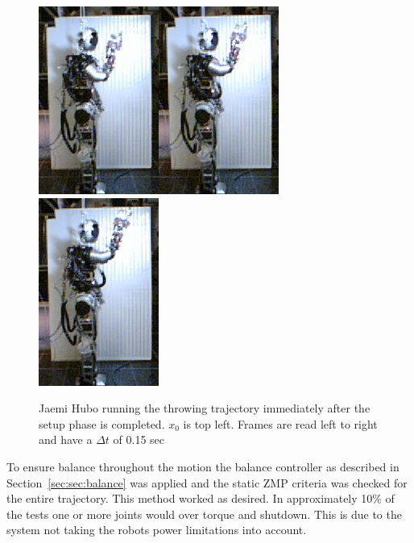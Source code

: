 \begin{figure}[ht]
\includegraphics[width=0.25\columnwidth]{./pix/slowMotion/5.png}\includegraphics[width=0.25\columnwidth]{./pix/slowMotion/6.png}\includegraphics[width=0.25\columnwidth]{./pix/slowMotion/7.png}
  \caption{Jaemi Hubo running the throwing trajectory immediately after the setup phase is completed.  $x_0$ is top left.  Frames are read left to right and have a $\Delta t$ of 0.15 sec\cite{dlofaro-srm}}
  \label{fig:3dThrowReal}
\end{figure}

To ensure balance throughout the motion the balance controller as described in Section~\ref{sec:sec:balance} was applied and the static ZMP criteria was checked for the entire trajectory.
This method worked as desired.  
In approximately 10\% of the tests one or more joints would over torque and shutdown.  
This is due to the system not taking the robots power limitations into account. 

